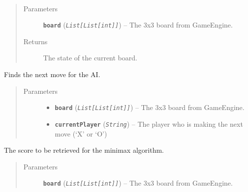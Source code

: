 \documentclass[letterpaper,10pt,english]{sphinxmanual}
\begin{document}
\begin{fulllineitems}
\begin{fulllineitems}
\label{index:AI._AIHard.isTerminalState}~\begin{quote}\begin{description}
\item[{Parameters}] \leavevmode
\textbf{\texttt{board}} (\emph{\texttt{List{[}List{[}int{]}{]}}}) -- The 3x3 board from GameEngine.

\item[{Returns}] \leavevmode
The state of the current board.

\end{description}\end{quote}

\end{fulllineitems}


\begin{fulllineitems}
\label{index:AI._AIHard.nextMove}
Finds the next move for the AI.
\begin{quote}\begin{description}
\item[{Parameters}] \leavevmode\begin{itemize}
\item {} 
\textbf{\texttt{board}} (\emph{\texttt{List{[}List{[}int{]}{]}}}) -- The 3x3 board from GameEngine.

\item {} 
\textbf{\texttt{currentPlayer}} (\emph{\texttt{String}}) -- The player who is making the next move (`X' or `O')

\end{itemize}

\end{description}\end{quote}

\end{fulllineitems}


\begin{fulllineitems}
\label{index:AI._AIHard.score}
The score to be retrieved for the minimax algorithm.
\begin{quote}\begin{description}
\item[{Parameters}] \leavevmode
\textbf{\texttt{board}} (\emph{\texttt{List{[}List{[}int{]}{]}}}) -- The 3x3 board from GameEngine.


\end{description}
\end{quote}
\end{fulllineitems}
\end{fulllineitems}
\end{document}
